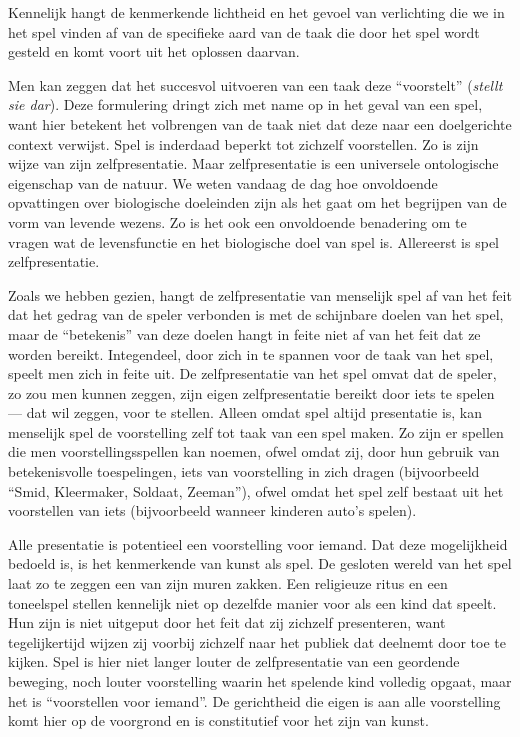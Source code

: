 Kennelijk hangt de kenmerkende lichtheid en het gevoel van verlichting die we in het spel vinden af van de specifieke aard van de taak die door het spel wordt gesteld en komt voort uit het oplossen daarvan.

Men kan zeggen dat het succesvol uitvoeren van een taak deze ``voorstelt'' (\textit{stellt sie dar}). Deze formulering dringt zich met name op in het geval van een spel, want hier betekent het volbrengen van de taak niet dat deze naar een doelgerichte context verwijst. Spel is inderdaad beperkt tot zichzelf voorstellen. Zo is zijn wijze van zijn zelfpresentatie. Maar zelfpresentatie is een universele ontologische eigenschap van de natuur. We weten vandaag de dag hoe onvoldoende opvattingen over biologische doeleinden zijn als het gaat om het begrijpen van de vorm van levende wezens. Zo is het ook een onvoldoende benadering om te vragen wat de levensfunctie en het biologische doel van spel is. Allereerst is spel zelfpresentatie.

Zoals we hebben gezien, hangt de zelfpresentatie van menselijk spel af van het feit dat het gedrag van de speler verbonden is met de schijnbare doelen van het spel, maar de ``betekenis'' van deze doelen hangt in feite niet af van het feit dat ze worden bereikt. Integendeel, door zich in te spannen voor de taak van het spel, speelt men zich in feite uit. De zelfpresentatie van het spel omvat dat de speler, zo zou men kunnen zeggen, zijn eigen zelfpresentatie bereikt door iets te spelen — dat wil zeggen, voor te stellen. Alleen omdat spel altijd presentatie is, kan menselijk spel de voorstelling zelf tot taak van een spel maken. Zo zijn er spellen die men voorstellingsspellen kan noemen, ofwel omdat zij, door hun gebruik van betekenisvolle toespelingen, iets van voorstelling in zich dragen (bijvoorbeeld ``Smid, Kleermaker, Soldaat, Zeeman''), ofwel omdat het spel zelf bestaat uit het voorstellen van iets (bijvoorbeeld wanneer kinderen auto's spelen).

Alle presentatie is potentieel een voorstelling voor iemand. Dat deze mogelijkheid bedoeld is, is het kenmerkende van kunst als spel. De gesloten wereld van het spel laat zo te zeggen een van zijn muren zakken. Een religieuze ritus en een toneelspel stellen kennelijk niet op dezelfde manier voor als een kind dat speelt. Hun zijn is niet uitgeput door het feit dat zij zichzelf presenteren, want tegelijkertijd wijzen zij voorbij zichzelf naar het publiek dat deelnemt door toe te kijken. Spel is hier niet langer louter de zelfpresentatie van een geordende beweging, noch louter voorstelling waarin het spelende kind volledig opgaat, maar het is ``voorstellen voor iemand''. De gerichtheid die eigen is aan alle voorstelling komt hier op de voorgrond en is constitutief voor het zijn van kunst.

